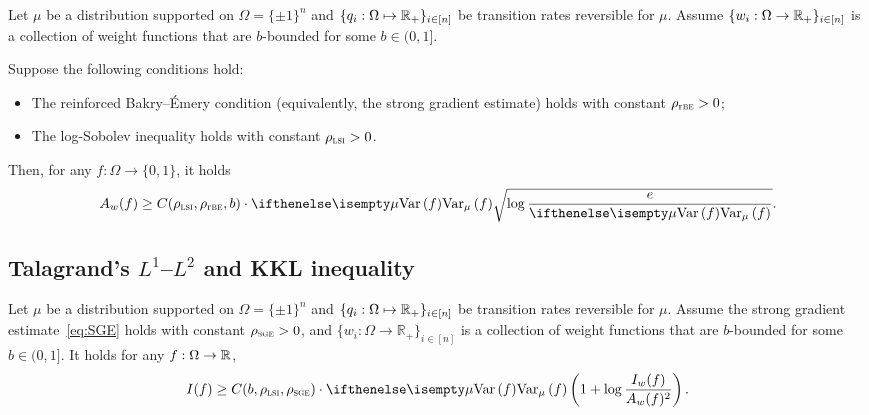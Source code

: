 \begin{corollary}\label{lem:improved_talagrand}
    Let $\mu$ be a distribution supported on $\Omega = \{\pm 1\}^n$ and $\{q_i: \Omega \mapsto \mathbb{R}_+\}_{i\in[n]}$ be transition rates reversible for $\mu$.
    Assume $\{w_i:\Omega \to \mathbb{R}_+\}_{i\in[n]}$ is a collection of weight functions that are $b$-bounded for some $b \in (0,1]$. 
    
    Suppose the following conditions hold: 
    \begin{itemize}
        \item The reinforced Bakry--\'Emery condition (equivalently, the strong gradient estimate) holds with constant $\rho_{\mathrm{r}{\normalfont\textsc{be}}} > 0$;
        \item The log-Sobolev inequality holds with constant $\rho_{{\normalfont\textsc{lsi}}} > 0$.
    \end{itemize}
    Then, for any $f:\Omega \to \{0,1\}$, it holds
   \begin{align}\label{eq:improved_talagrand}
        A_w(f) 
        \geq C(\rho_{\LSI},\rho_{\RBE},b) \cdot \Var[\mu]{f}\sqrt{\log \frac e{\Var[\mu]{f}}}.
   \end{align}
\end{corollary}



\subsection{Talagrand's $L^1$--$L^2$ and KKL inequality}

\begin{theorem}\label{lem:l1_l2_talagrand_weak}
    Let $\mu$ be a distribution supported on $\Omega = \{\pm 1\}^n$ and $\{q_i: \Omega \mapsto \mathbb{R}_+\}_{i\in[n]}$ be transition rates reversible for $\mu$.
    Assume the strong gradient estimate~\eqref{eq:SGE} holds with constant $\rho_{{\normalfont\textsc{sge}}} > 0$, and $\{w_i:\Omega \to \mathbb{R}_+\}_{i \in [n]}$ is a collection of weight functions that are $b$-bounded for some $b \in (0,1]$. It holds for any $f:\Omega \to \mathbb{R}$,
    \begin{align}\label{eq:l1_l2_talagrand_weak}
        I(f) \geq C(b,\rho_{\LSI},\rho_{\SGE})\cdot \Var[\mu]{f}\tp{1 + \log \frac{I_w(f)}{A_w(f)^2}} .
    \end{align}
\end{theorem}

